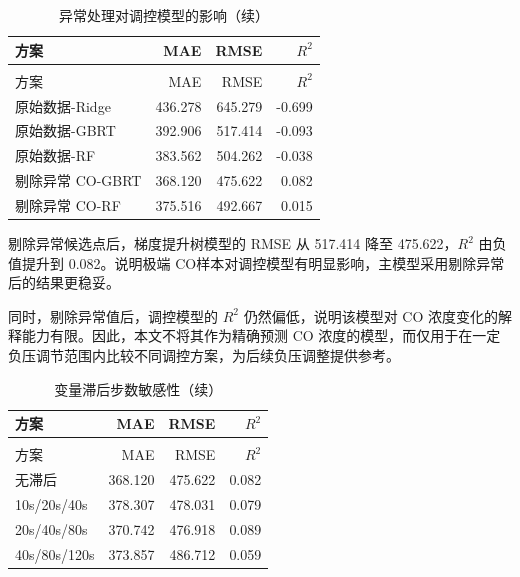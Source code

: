 \documentclass[UTF8,a4paper,zihao=-4]{ctexart}
\newcommand{\CO}{CO}
\begin{document}
\begin{longtable}{l r r r}
\caption{异常处理对调控模型的影响}\\
\toprule
方案 & MAE & RMSE & $R^2$ \\
\midrule
\endfirsthead
\caption[]{异常处理对调控模型的影响（续）}\\
\toprule
方案 & MAE & RMSE & $R^2$ \\
\midrule
\endhead
\bottomrule
\endfoot
原始数据-Ridge & 436.278 & 645.279 & -0.699 \\
原始数据-GBRT & 392.906 & 517.414 & -0.093 \\
原始数据-RF & 383.562 & 504.262 & -0.038 \\
剔除异常 \CO-GBRT & 368.120 & 475.622 & 0.082 \\
剔除异常 \CO-RF & 375.516 & 492.667 & 0.015 \\
\end{longtable}

剔除异常候选点后，梯度提升树模型的 RMSE 从 517.414 降至 475.622，$R^2$ 由负值提升到 0.082。说明极端 \CO 样本对调控模型有明显影响，主模型采用剔除异常后的结果更稳妥。

同时，剔除异常值后，调控模型的 $R^2$ 仍然偏低，说明该模型对 CO 浓度变化的解释能力有限。因此，本文不将其作为精确预测 CO 浓度的模型，而仅用于在一定负压调节范围内比较不同调控方案，为后续负压调整提供参考。

\begin{longtable}{l r r r}
\caption{变量滞后步数敏感性}\\
\toprule
方案 & MAE & RMSE & $R^2$ \\
\midrule
\endfirsthead
\caption[]{变量滞后步数敏感性（续）}\\
\toprule
方案 & MAE & RMSE & $R^2$ \\
\midrule
\endhead
\bottomrule
\endfoot
无滞后 & 368.120 & 475.622 & 0.082 \\
10s/20s/40s & 378.307 & 478.031 & 0.079 \\
20s/40s/80s & 370.742 & 476.918 & 0.089 \\
40s/80s/120s & 373.857 & 486.712 & 0.059 \\
\end{longtable}
\end{document}
